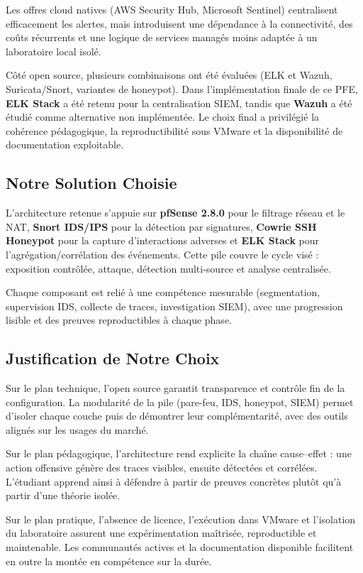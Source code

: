 \documentclass[12pt,a4paper,openany]{report}
\begin{document}
	Les offres cloud natives (AWS Security Hub, Microsoft Sentinel) centralisent efficacement les alertes, mais introduisent une dépendance à la connectivité, des coûts récurrents et une logique de services managés moins adaptée à un laboratoire local isolé.
	
	Côté open source, plusieurs combinaisons ont été évaluées (ELK et Wazuh, Suricata/Snort, variantes de honeypot). Dans l'implémentation finale de ce PFE, \textbf{ELK Stack} a été retenu pour la centralisation SIEM, tandis que \textbf{Wazuh} a été étudié comme alternative non implémentée. Le choix final a privilégié la cohérence pédagogique, la reproductibilité sous VMware et la disponibilité de documentation exploitable.
	
	\subsection{Notre Solution Choisie}
	
	L'architecture retenue s'appuie sur \textbf{pfSense 2.8.0} pour le filtrage réseau et le NAT, \textbf{Snort IDS/IPS} pour la détection par signatures, \textbf{Cowrie SSH Honeypot} pour la capture d'interactions adverses et \textbf{ELK Stack} pour l'agrégation/corrélation des événements. Cette pile couvre le cycle visé : exposition contrôlée, attaque, détection multi-source et analyse centralisée.
	
	Chaque composant est relié à une compétence mesurable (segmentation, supervision IDS, collecte de traces, investigation SIEM), avec une progression lisible et des preuves reproductibles à chaque phase.
	
	\subsection{Justification de Notre Choix}
	
	Sur le plan technique, l'open source garantit transparence et contrôle fin de la configuration. La modularité de la pile (pare-feu, IDS, honeypot, SIEM) permet d'isoler chaque couche puis de démontrer leur complémentarité, avec des outils alignés sur les usages du marché.
	
	Sur le plan pédagogique, l'architecture rend explicite la chaîne cause--effet : une action offensive génère des traces visibles, ensuite détectées et corrélées. L'étudiant apprend ainsi à défendre à partir de preuves concrètes plutôt qu'à partir d'une théorie isolée.
	
	Sur le plan pratique, l'absence de licence, l'exécution dans VMware et l'isolation du laboratoire assurent une expérimentation maîtrisée, reproductible et maintenable. Les communautés actives et la documentation disponible facilitent en outre la montée en compétence sur la durée.
	
\end{document}
